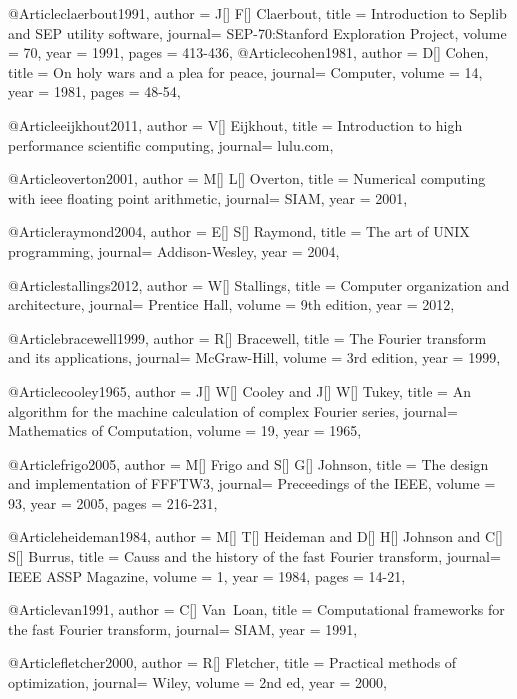 {@Article{claerbout1991,
  author = 	 {J[] F[] Claerbout},
  title  = 	 {Introduction to Seplib and SEP utility software},
  journal= 	 {SEP-70:Stanford Exploration Project},
  volume =	 {70},
  year   = 	 1991,
  pages  =	 413-436,
}
@Article{cohen1981,
  author = 	 {D[] Cohen},
  title  = 	 {On holy wars and a plea for peace},
  journal= 	 {Computer},
  volume =	 {14},
  year   = 	 1981,
  pages  =   	 48-54,
}

@Article{eijkhout2011,
  author = 	 {V[] Eijkhout},
  title  = 	 {Introduction to high performance scientific computing},
  journal= 	 {lulu.com},
}

@Article{overton2001,
  author = 	 {M[] L[] Overton},
  title  = 	 {Numerical computing with ieee floating point arithmetic},
  journal= 	 {SIAM},
  year   = 	 2001,
}

@Article{raymond2004,
  author = 	 {E[] S[] Raymond},
  title  = 	 {The art of UNIX programming},
  journal= 	 {Addison-Wesley},
  year   = 	 2004,
}

@Article{stallings2012,
  author = 	 {W[] Stallings},
  title  = 	 {Computer organization and architecture},
  journal= 	 {Prentice Hall},
  volume =	 {9th edition},
  year   = 	 2012,
}

@Article{bracewell1999,
  author = 	 {R[] Bracewell},
  title  = 	 {The Fourier transform and its applications},
  journal= 	 {McGraw-Hill},
  volume =	 {3rd edition},
  year   = 	 1999,
}

@Article{cooley1965,
  author = 	 {J[] W[] Cooley and J[] W[] Tukey},
  title  = 	 {An algorithm for the machine calculation of complex Fourier series},
  journal= 	 {Mathematics of Computation},
  volume =	 {19},
  year   = 	 1965,
}

@Article{frigo2005,
  author = 	 {M[] Frigo and S[] G[] Johnson},
  title  = 	 {The design and implementation of FFFTW3},
  journal= 	 {Preceedings of the IEEE},
  volume =	 {93},
  year   = 	 2005,
  pages = 216-231,
}

@Article{heideman1984,
  author = 	 {M[] T[] Heideman and D[] H[] Johnson and C[] S[] Burrus},
  title  = 	 {Causs and the history of the fast Fourier transform},
  journal= 	 {IEEE ASSP Magazine},
  volume =	 {1},
  year   = 	 1984,
  pages = 14-21,
}

@Article{van1991,
  author = 	 {C[] Van~Loan},
  title  = 	 {Computational frameworks for the fast Fourier transform},
  journal= 	 {SIAM},
  year   = 	 1991,
}

@Article{fletcher2000,
  author = 	 {R[] Fletcher},
  title  = 	 {Practical methods of optimization},
  journal= 	 {Wiley},
  volume =	 {2nd ed},
  year   = 	 2000,
}

}
